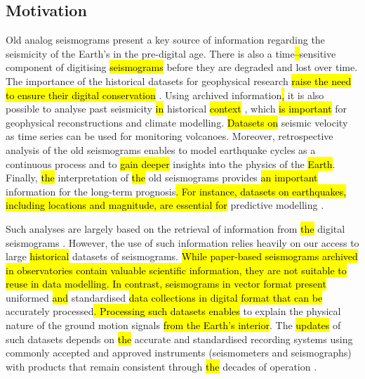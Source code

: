 \documentclass[sensors,article,submit,moreauthors,pdftex]{Definitions/mdpi}
\begin{document}
\subsection{Motivation}
Old analog seismograms present a key source of information regarding the seismicity of the Earth's in the pre-digital age.\hl{ }There is also a time\hl{--}sensitive component of digitising \hl{seismograms} before they are degraded and lost over time. The importance of the historical datasets for geophysical research\hl{ raise the need to ensure their digital conservation }\cite{Vogtetal1985, TevesCosta1999,Bono2007,Okal}. Using archived information\hl{, }it is also possible to analyse past seismicity \hl{in }historical\hl{ context } \cite{Alexandre1990a,Alexandre1985,Alexandre1990b}, which \hl{is important }for geophysical reconstructions and climate modelling. \hl{Datasets on }seismic velocity as time series\hl{ }can be used for monitoring volcanoes. Moreover, retrospective analysis of the old seismograms enables to model earthquake cycles\hl{ }as a continuous process and to \hl{gain deeper }insights into the physics of the \hl{Earth}. Finally, \hl{the }interpretation of \hl{the }old seismograms provides \hl{an important }information for the long-term prognosis\hl{. For instance, datasets on earthquakes, including locations and magnitude, are essential for }predictive modelling \cite{Kanamori1988}.

Such analyses are largely based on the retrieval of information from \hl{the }digital seismograms \cite{Claerbout1992}. However, the use of such information relies heavily on our access to large \hl{historical }datasets of seismograms. \hl{While paper-based seismograms archived in observatories contain valuable scientific information, they are not suitable to reuse in data modelling. In contrast, seismograms in vector format present }uniformed \hl{and }standardised \hl{data collections in digital format that can be} accurately processed\hl{. Processing such datasets enables} to explain the physical nature of the ground motion signals \hl{from the Earth's interior}. 
The \hl{updates} of such datasets depends on \hl{the }accurate and standardised recording systems using commonly accepted and approved instruments (seismometers and seismographs) with products that remain consistent through \hl{the }decades of operation \cite{UdiasBuforn2017}. 
\end{document}
